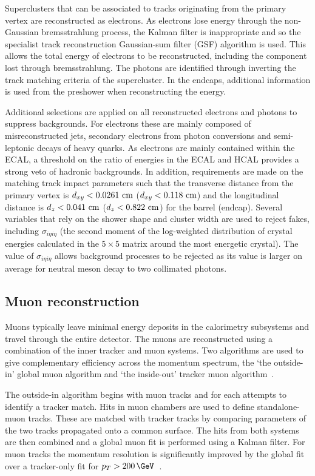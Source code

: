 Superclusters that can be associated to tracks originating from the primary vertex are reconstructed as electrons.
As electrons lose energy through the non-Gaussian bremsstrahlung process, the Kalman filter is inappropriate and
so the specialist track reconstruction Gaussian-sum filter (GSF) algorithm is used. This allows the total energy of
electrons to be reconstructed, including the component lost through bremsstrahlung. The photons are identified 
through inverting the track matching criteria of the supercluster. In the endcaps, additional information
is used from the preshower when reconstructing the energy.

Additional selections are applied on all reconstructed electrons and photons to suppress backgrounds.
For electrons these are mainly composed of misreconstructed jets, secondary electrons from photon
conversions and semi-leptonic decays of heavy quarks. As electrons are mainly contained within 
the ECAL, a threshold on the ratio of energies in the ECAL and HCAL provides a strong veto of hadronic
backgrounds. In addition, requirements are made on the matching track impact
parameters such that the transverse distance from the primary vertex is $d_{xy} < 0.0261\,\,\text{cm}$ ($d_{xy} < 0.118\,\,\text{cm}$) 
and the longitudinal distance is $d_z < 0.041\,\,\text{cm}$ ($d_z < 0.822\,\,\text{cm}$) for the barrel (endcap). 
Several variables that rely on the shower shape and cluster width are used to
reject fakes, including $\sigma_{i\eta i\eta}$ (the second moment of the log-weighted
distribution of crystal energies calculated in the $5\times5$ matrix around the
most energetic crystal). The value of $\sigma_{i\eta i\eta}$ allows background
processes to be rejected as its value is larger on average for neutral meson decay to two collimated photons.

\subsection{Muon reconstruction}
\label{sec:muon_reco}

Muons typically leave minimal energy deposits in the calorimetry
subsystems and travel through the entire detector. The muons are reconstructed using a 
combination of the inner tracker and muon systems. Two algorithms are used to 
give complementary efficiency across the momentum spectrum, the `the outside-in' 
global muon algorithm and `the inside-out' tracker muon algorithm~\cite{muon_reco}.

The outside-in algorithm begins with muon tracks and for each attempts to
identify a tracker match. Hits in muon chambers are used to define standalone-muon tracks. 
These are matched with tracker tracks by comparing parameters of the two tracks propagated 
onto a common surface. The hits from both systems are then combined and a global muon fit 
is performed using a Kalman filter. For muon tracks the momentum resolution is significantly improved by 
the global fit over a tracker-only fit for $p_T > 200\,\GeV$~\cite{CMS,muon_reco_cosmic}. 

